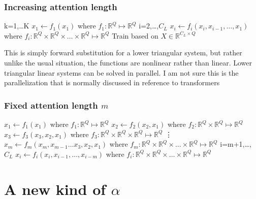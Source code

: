\documentclass{article}
\begin{document}
\subsubsection{Increasing attention length}

\begin{algorithm}
\begin{algorithmic}
\For k=1,\dots K
   \State $x_1 \gets f_1(x_1)$ where $f_1: \mathbb{R}^Q  \mapsto \mathbb{R}^Q$
   \For i=2,\dots,$C_L$
       \State $x_i \gets f_i(x_i, x_{i-1}, \dots, x_1)$ where $f_i: \mathbb{R}^Q \times \mathbb{R}^Q \times \dots \times \mathbb{R}^Q  \mapsto \mathbb{R}^Q$
   \EndFor
\EndFor
\State Train based on $X \in \mathbb{R}^{C_L \times Q}$ 
\end{algorithmic}
\end{algorithm}

This is simply forward substitution for a lower triangular system, but rather unlike the usual situation, the functions are nonlinear rather than linear. Lower triangular linear systems can be solved in parallel. I am not sure this is the parallelization that is normally discussed in reference to transformers

\subsubsection{Fixed attention length $m$}
\begin{algorithm}
\begin{algorithmic}
   \State $x_1 \gets f_1(x_1)$ where $f_1: \mathbb{R}^Q  \mapsto \mathbb{R}^Q$
   \State $x_2 \gets f_2(x_2,x_1)$ where $f_2: \mathbb{R}^Q \times \mathbb{R}^Q \mapsto \mathbb{R}^Q$
   \State $x_3 \gets f_3(x_3,x_2,x_1)$ where $f_3: \mathbb{R}^Q \times \mathbb{R}^Q \times \mathbb{R}^Q \mapsto \mathbb{R}^Q$
   \State \qquad \vdots
   \State $x_m \gets f_m(x_m, x_{m-1} \dots x_3,x_2,x_1)$ where $f_m: \mathbb{R}^Q \times \mathbb{R}^Q \times \dots \times \mathbb{R}^Q  \mapsto \mathbb{R}^Q$ 
   \For i=m+1,\dots,$C_L$
       \State $x_i \gets f_i(x_i, x_{i-1}, \dots, x_{i-m})$ where $f_i: \mathbb{R}^Q \times \mathbb{R}^Q \times \dots \times \mathbb{R}^Q  \mapsto \mathbb{R}^Q$
   \EndFor

\end{algorithmic}
\end{algorithm}

\section{A new kind of $\alpha$}
\end{document}
